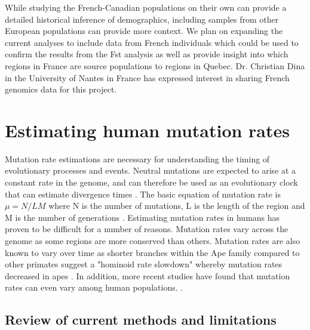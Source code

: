 \documentclass[
11pt, %
oneside, %
english, %
doublespacing, %
headsepline, %
chapterinoneline, %
]{MastersDoctoralThesis} %
\begin{document}
While studying the French-Canadian populations on their own can provide a detailed historical inference of demographics, including samples from other European populations can provide more context.
We plan on expanding the current analyses to include data from French individuals which could be used to confirm the results from the Fst analysis as well as provide insight into which regions in France are source populations to regions in Quebec.
Dr. Christian Dina in the University of Nantes in France has expressed interest in sharing French genomics data for this project.
\clearpage

\chapter{Estimating human mutation rates}

Mutation rate estimations are necessary for understanding the timing of evolutionary processes and events.
Neutral mutations are expected to arise at a constant rate in the genome, and can therefore be used as an evolutionary clock that can estimate divergence times \citep{Moorjani2016}. 
The basic equation of mutation rate is $\mu = N / LM$ where N is the number of mutations, L is the length of the region and M is the number of generations \citep{Narasimhan2016}.
Estimating mutation rates in humans has proven to be difficult for a number of reasons.
Mutation rates vary across the genome as some regions are more conserved than others. 
Mutation rates are also known to vary over time as shorter branches within the Ape family compared to other primates suggest a "hominoid rate slowdown" whereby mutation rates decreased in apes \citep{Moorjani2016, Scally2012}.
In addition, more recent studies have found that mutation rates can even vary among human populations. \citep{Harris2015a, Harris2017a}.

\section{Review of current methods and limitations}
\end{document}
